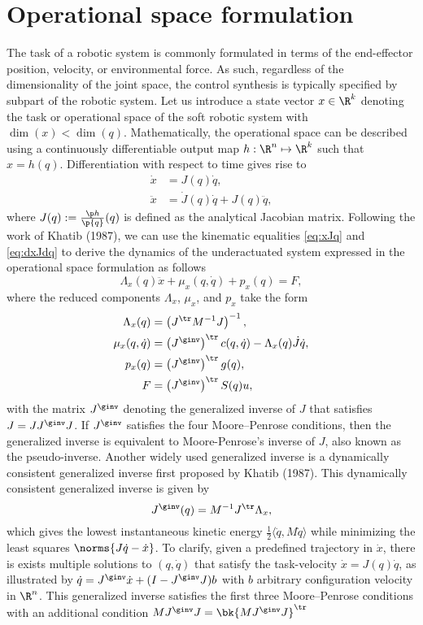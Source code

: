 \section{Operational space formulation}
The task of a robotic system is commonly formulated in terms of the end-effector position, velocity, or environmental force. As such, regardless of the dimensionality of the joint space, the control synthesis is typically specified by subpart of the robotic system. Let us introduce a state vector $x \in \R^k$ denoting the task or operational space of the soft robotic system with $\dim(x) < \dim(q)$. Mathematically, the operational space can be described using a continuously differentiable output map $h: \R^n \mapsto \R^k$ such that $x = h(q)$. Differentiation with respect to time gives rise to
\begin{align}
\dot{x} & = J(q) \dot{q}, \label{eq:xJq}\\
\ddot{x} & = \dot{J}(q)\dot{q} + J(q) \ddot{q} \label{eq:dxJdq}, 
\end{align}
where $J(q):= \frac{\p h}{\p {q}}(q)$ is defined as the analytical Jacobian matrix. Following the work of Khatib (1987), we can use the kinematic equalities \eqref{eq:xJq} and \eqref{eq:dxJdq} to derive the dynamics of the underactuated system expressed in the operational space formulation as follows
\begin{equation}
\Lambda_x(q)\ddot{x} + \mu_x(q,\dot{q}) + p_x(q) = F,
\end{equation}
where the reduced components $\Lambda_x$, $\mu_x$, and $p_x$ take the form 
\begin{align}
\Lambda_x(q) & = \left(J^\tr M^{-1} J \right)^{-1}, \\
\mu_x(q,\dot{q}) & = \left(J^\ginv\right)^\tr c(q,\dot{q}) - \Lambda_x(q) \dot{J} \dot{q}, \\
p_x(q) & = \left(J^\ginv\right)^\tr g(q), \\
F & = \left(J^\ginv\right)^\tr S(q) u,
\end{align}
with the matrix $J^\ginv$ denoting the generalized inverse of $J$ that satisfies $J = J J^\ginv J$. If $J^\ginv$ satisfies the four Moore–Penrose conditions, then the generalized inverse is equivalent to Moore-Penrose's inverse of $J$, also known as the pseudo-inverse. Another widely used generalized inverse is a dynamically consistent generalized inverse first proposed by Khatib (1987). This dynamically consistent generalized inverse is given by
\begin{equation}
J^\ginv(q) = M^{-1}\! \, J^\tr\!\, \Lambda_x,
\end{equation}
which gives the lowest instantaneous kinetic energy $\frac{1}{2} \langle \dot{q}, M\dot{q} \rangle$ while minimizing the least squares $\norms{J \dot{q} - \dot{x}}$. To clarify, given a predefined trajectory in $\dot{x}$, there is exists multiple solutions to $(q,\dot{q})$ that satisfy the task-velocity $\dot{x} = J(q)\dot{q}$, as illustrated by $\dot{q} = J^\ginv \dot{x} + (I - J^\ginv J)b$ with $b$ arbitrary configuration velocity in $\R^n$. This generalized inverse satisfies the first three Moore–Penrose conditions with an additional condition $M J^\ginv J = \bk{M J^\ginv J}^\tr$

